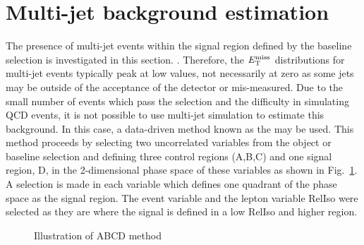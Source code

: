 \section{Multi-jet background estimation}
\label{sec:QCDbackground}
The presence of multi-jet events within the signal region defined by the baseline selection is investigated in this section. . Therefore, the $E_{\mathrm{T}}^{\text{miss}}$ distributions for multi-jet events typically peak at low values, not necessarily at zero as some jets may be outside of the acceptance of the detector or mis-measured. Due to the small number of events which pass the selection and the difficulty in simulating QCD events, it is not possible to use multi-jet simulation to estimate this background. In this case, a data-driven method known as the  may be used. This method proceeds by selecting two uncorrelated variables from the object or baseline selection and defining three control regions (A,B,C) and one signal region, D, in the 2-dimensional phase space of these variables as shown in Fig.~\ref{fig:ABCDdiagram}. A selection is made in each variable which defines one quadrant of the phase space as the signal region.  The event variable \MET and the lepton variable RelIso were selected as they are  where the signal is defined in a low RelIso and higher \MET region.\\

\begin{figure}[ht!]
\begin{center}
\hspace{0.2cm}
\end{center}
\caption{Illustration of ABCD method}
\label{fig:ABCDdiagram}
\end{figure}

